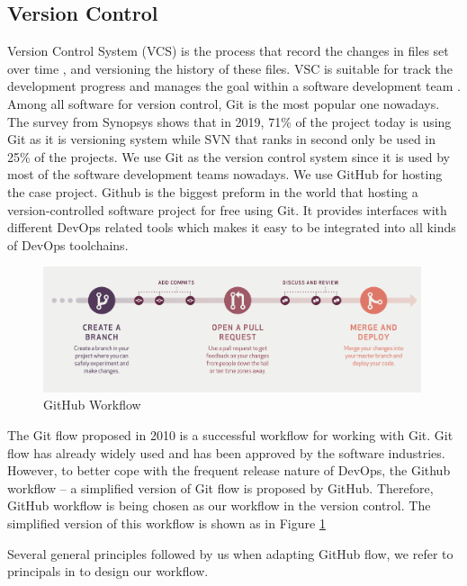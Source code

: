 \subsection{Version Control}
\label{vcs}
Version Control System (VCS) is the process that record the changes in files set over time \cite{GitAbout93:online}, and versioning the history of these files. VSC is suitable for track the development progress and manages the goal within a software development team \cite{loeliger2012version}. Among all software for version control, Git is the most popular one nowadays. The survey \cite{CompareR31:online} from Synopsys shows that in 2019, 71\% of the project today is using Git as it is versioning system while SVN that ranks in second only be used in 25\% of the projects. We use Git as the version control system since it is used by most of the software development teams nowadays. We use GitHub for hosting the case project. Github is the biggest preform in the world that hosting a version-controlled software project for free using Git. It provides interfaces with different DevOps related tools which makes it easy to be integrated into all kinds of DevOps toolchains.
\begin{figure}[h]
\centering
\includegraphics[width=0.99\textwidth]{pics/git.png}
\caption{GitHub Workflow \cite{guides2013understanding}}
\label{fig:git}
\end{figure}
\par
The Git flow \cite{driessen2010successful} proposed in 2010 is a successful workflow for working with Git. Git flow has already widely used and has been approved by the software industries. However, to better cope with the frequent release nature of DevOps, the Github workflow -- a simplified version of Git flow is proposed by GitHub.
Therefore, GitHub workflow \cite{chacongithub} is being chosen as our workflow in the version control. The simplified version of this workflow is shown as in Figure \ref{fig:git}
\par
Several general principles followed by us when adapting GitHub flow, we refer to principals in \cite{chacongithub} to design our workflow.
